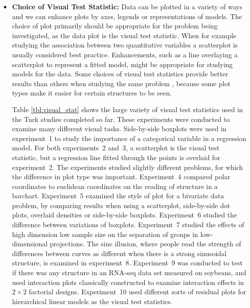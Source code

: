 \documentclass[10pt]{article}\usepackage[]{graphicx}\usepackage[]{color}
\newcommand{\dc}[1]{{\color{green} #1}}
\begin{document}

\begin{itemize} \itemsep 0in \parsep-10pt %
\item{\bf Choice of Visual Test Statistic:}  
Data can be plotted in a variety of ways and we can enhance plots by axes, legends or representations of models. The choice of plot primarily should be appropriate for the problem being investigated, as the data plot is the visual test statistic. 
When for example studying the association between two quantitative variables a scatterplot is usually considered best practice. Enhancements, such as a line overlaying a scatterplot to represent a fitted model, might be appropriate for studying models for the data.  Some choices of visual test statistics provide better results than others when studying the same problem \citep{heike:2012}, because some plot types make it easier for certain structures to be seen. 

Table \ref{tbl:visual_stat} shows the large variety of visual test statistics used in the Turk studies completed so far. These experiments were conducted to examine many different visual tasks. Side-by-side boxplots were used in experiment~1 to study the importance of a categorical variable in a regression model. For both experiments~2 and~3, a scatterplot is the visual test statistic, but a regression line fitted through the points is overlaid for experiment~2. The experiments studied slightly different problems, for which the difference in plot type was important. Experiment~4 compared polar coordinates to euclidean coordinates on the reading of structure in a barchart.  Experiment~5 examined the style of plot for a bivariate data problem, by comparing results when using a scatterplot, side-by-side dot plots, overlaid densities or side-by-side boxplots. Experiment~6 studied the difference between variations of boxplots. Experiment~7 studied the effects of high dimension low sample size on the separation of groups in low-dimensional projections. The sine illusion, where people read the strength of differences between curves as different when there is a strong sinusoidal structure, is examined in experiment~8. Experiment~9 was conducted to test if there was any structure in an RNA-seq data set measured on soybeans, and used interaction plots classically constructed to examine interaction effects in $2\times 2$ factorial designs. Experiment~10 used different sorts of residual plots for hierarchical linear models as the visual test statistics. 


\end{itemize}
\end{document}
